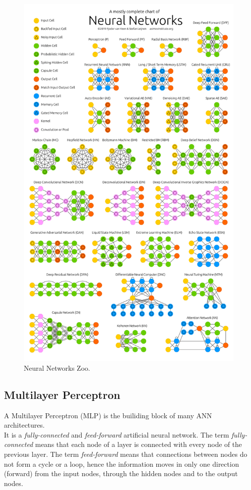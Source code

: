 \begin{figure}[h]
\centering
\includegraphics[scale=0.05]{Chapters/Chapter2/NeuralNetworkZoo.png}
\caption{Neural Networks Zoo.}
\label{fig:zoo}
\end{figure}

\subsection{Multilayer Perceptron}

A Multilayer Perceptron (MLP) is the builiding block of many ANN architectures.\\
It is a \textit{fully-connected} and \textit{feed-forward} artificial neural network.
The term \textit{fully-connected} means that each node of a layer is connected with every node of the previous layer.
The term \textit{feed-forward} means that connections between nodes do not form a cycle or a loop, hence the information moves in only 
one direction (forward) from the input nodes, through the hidden nodes and to the output nodes.


